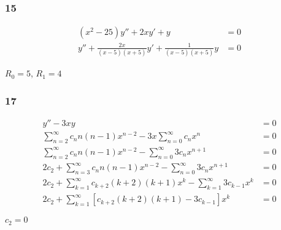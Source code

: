 \documentclass{article}
\begin{document}
\subsubsection{15}

\begin{align*}
  (x^2 - 25) y'' + 2 x y' + y                                        & = 0 \\
  y'' + \frac{2 x}{(x - 5) (x + 5)} y' + \frac{1}{(x - 5) (x + 5)} y & = 0
\end{align*}

$R_0 = 5$, $R_1 = 4$

\subsubsection{17}

\begin{align*}
  y'' - 3 x y                                                                                     & = 0 \\
  \sum_{n = 2}^\infty c_n n (n - 1) x^{n - 2} - 3 x \sum_{n = 0}^\infty c_n x^n                   & = 0 \\
  \sum_{n = 2}^\infty c_n n (n - 1) x^{n - 2} - \sum_{n = 0}^\infty 3 c_n x^{n + 1}               & = 0 \\
  2 c_2 + \sum_{n = 3}^\infty c_n n (n - 1) x^{n - 2} - \sum_{n = 0}^\infty 3 c_n x^{n + 1}       & = 0 \\
  2 c_2 + \sum_{k = 1}^\infty c_{k + 2} (k + 2) (k + 1) x^k - \sum_{k = 1}^\infty 3 c_{k - 1} x^k & = 0 \\
  2 c_2 + \sum_{k = 1}^\infty [c_{k + 2} (k + 2) (k + 1) - 3 c_{k - 1}] x^k                       & = 0
\end{align*}

$c_2 = 0$
\end{document}
